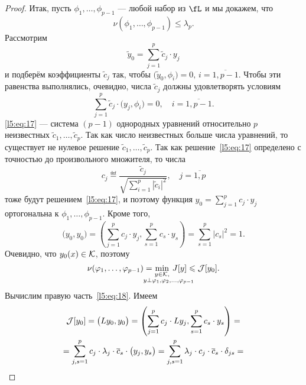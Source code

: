 \begin{proof}
	Итак, пусть $\phi_1,\ldots,\phi_{p-1}$ --- любой набор из $\fL$ и мы докажем, что
	\begin{equation}
		\label{l5:eq:16}
		\nu(\phi_1,\ldots,\phi_{p-1})\leqslant\lambda_p.
	\end{equation}  
	Рассмотрим 
	\begin{equation*}
		 \tilde{y}_0=\sum\limits_{j=1}^{p}\tilde{c}_j\cdot y_j
	\end{equation*}
	и подберём коэффициенты $\tilde{c}_j$ так, чтобы $\big(\tilde{y}_0,\phi_i\big)=0,\,i=\overline{1,p-1}$. Чтобы эти равенства выполнялись, очевидно, числа $\tilde{c}_j$ должны удовлетворять условиям
	\begin{equation}
		\label{l5:eq:17}
		 \sum\limits_{j=1}^{p}\tilde{c}_j\cdot \big(y_j,\phi_i\big)=0,\quad i=\overline{1,p-1}.
	\end{equation} 
	\eqref{l5:eq:17} --- система $(p-1)$ однородных уравнений относительно $p$ неизвестных $\tilde{c}_1,\ldots,\tilde{c}_p$. Так как число неизвестных больше числа уравнений, то существует не нулевое решение $\tilde{c}_1,\ldots,\tilde{c}_p$. Так как решение~\eqref{l5:eq:17} определено с точностью до произвольного множителя, то числа 
	\begin{equation*}
		 c_j\eqdef\frac{\tilde{c}_j}{\sqrt{\sum\limits_{i=1}^p|\tilde{c}_i|^2}},\quad j=\overline{1,p}
	\end{equation*}
	тоже будут решением~\eqref{l5:eq:17}{\mb,} и поэтому функция $\displaystyle y_0=\sum\limits_{j=1}^{p}c_j\cdot y_j$ ортогональна к $\phi_1,\ldots,\phi_{p-1}$. Кроме того{\mb,}
	\begin{equation*}
		\big(y_0,y_0\big)=\left(\sum\limits_{j=1}^{p}c_j\cdot y_j,\sum\limits_{s=1}^{p}c_s\cdot y_s\right)=\sum\limits_{s=1}^p|c_s|^2=1.
	\end{equation*}
	Очевидно, что $y_0(x)\in\mathcal{K}$, поэтому
	\begin{equation}
		\label{l5:eq:18}
		\nu(\phi_1,\ldots,\phi_{p-1})=\min\limits_{\substack{y\in\K,\\\lefteqn{\scriptstyle \hspace*{-0.8cm}y\perp\phi_1,\phi_2,\ldots,\phi_{p-1}}}}\,J[y]\leqslant\J[y_0].
	\end{equation} 
	Вычислим правую часть~\eqref{l5:eq:18}. Имеем
	\begin{multline}
		\label{l5:eq:19}
		\J[y_0]=\big(Ly_0,y_0\big)=\left(\sum\limits_{j=1}^{p}c_j\cdot Ly_j,\sum\limits_{s=1}^{p}c_s\cdot y_s\right)=\\=\sum\limits_{j,s=1}^{p}c_j\cdot\lambda_j\cdot\overline{c}_s\cdot\big(y_j,y_s\big)=\sum\limits_{j,s=1}^{p}\lambda_j\cdot c_j\cdot\overline{c}_s\cdot\delta_{js}=\\

\end{multline}
\end{proof}
